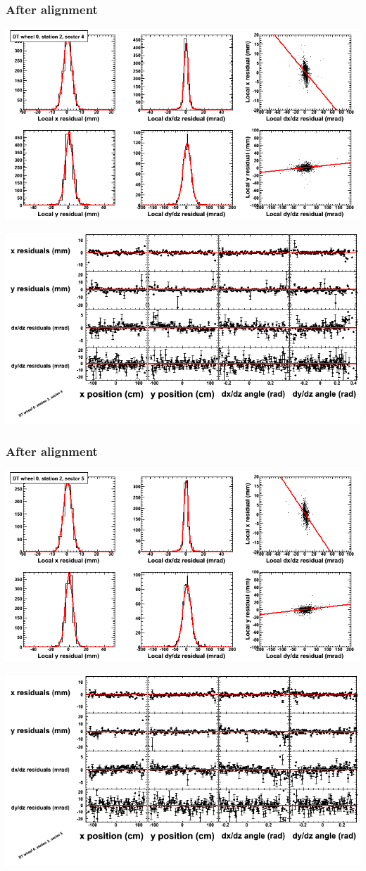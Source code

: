 \documentclass[compress]{beamer}
\begin{document}
\begin{frame}
\frametitle{After alignment}
\includegraphics[width=0.7\linewidth]{NOV4_fitfunctions/MBwhCst2sec04_bellcurves.png}

\includegraphics[width=0.7\linewidth]{NOV4_fitfunctions/MBwhCst2sec04_polynomials.png}
\end{frame}

\begin{frame}
\frametitle{After alignment}
\includegraphics[width=0.7\linewidth]{NOV4_fitfunctions/MBwhCst2sec05_bellcurves.png}

\includegraphics[width=0.7\linewidth]{NOV4_fitfunctions/MBwhCst2sec05_polynomials.png}
\end{frame}
\end{document}
